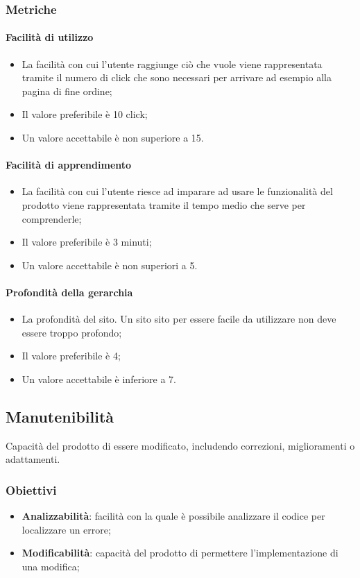 		\subsubsection{Metriche}
			\paragraph{Facilità di utilizzo}
			\begin{itemize}
			\item La facilità con cui l'utente raggiunge ciò che vuole viene rappresentata tramite il numero di click che sono necessari per arrivare ad esempio alla pagina di fine ordine;
			\item Il valore preferibile è 10 click;
			\item Un valore accettabile è non superiore a 15.
			\end{itemize}
			\paragraph{Facilità di apprendimento}
			\begin{itemize}
			\item La facilità con cui l'utente riesce ad imparare ad usare le funzionalità del prodotto viene rappresentata tramite il tempo medio che serve per comprenderle;
			\item Il valore preferibile è 3 minuti;
			\item Un valore accettabile è non superiori a 5.
			\end{itemize}
			\paragraph{Profondità della gerarchia}
			\begin{itemize}
			\item La profondità del sito. Un sito sito per essere facile da utilizzare non deve essere troppo profondo;
			\item Il valore preferibile è 4;
			\item Un valore accettabile è inferiore a 7.
			\end{itemize}
	\subsection{Manutenibilità}
	Capacità del prodotto di essere modificato, includendo correzioni, miglioramenti o adattamenti.
		\subsubsection{Obiettivi}
		\begin{itemize}
			\item \textbf{Analizzabilità}: facilità con la quale è possibile analizzare il codice per localizzare un errore;
			\item \textbf{Modificabilità}: capacità del prodotto di permettere l'implementazione di una modifica;
		\end{itemize}
